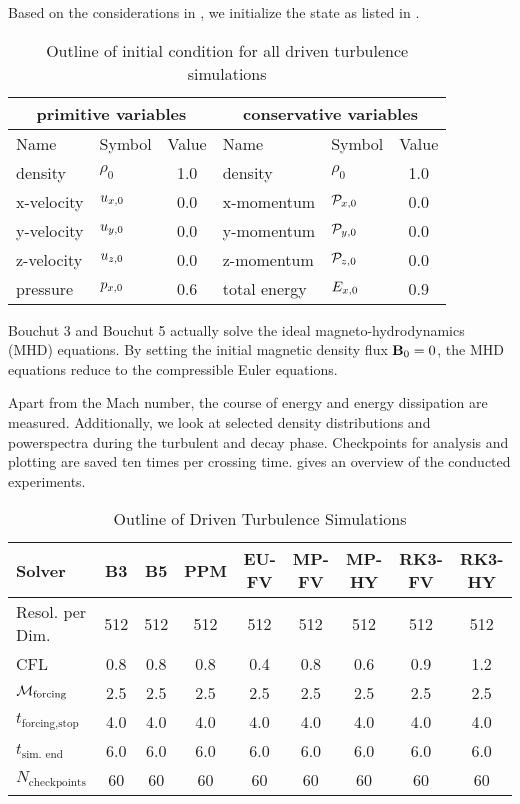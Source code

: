 Based on the considerations in , we initialize the
state as listed in . 
\begin{table}[H]
\caption{Outline of initial condition for all driven turbulence simulations}
\centering
\begin{tabular}{llc|llc}
\toprule
\multicolumn{3}{c}{primitive variables} &
\multicolumn{3}{c}{conservative variables} \\
\midrule
Name & Symbol & Value & Name & Symbol & Value\\
\midrule
density         & $\rho_0$            & 1.0 & density         & $\rho_0$            & 1.0 \\ 
x-velocity      & $u_{x,0}$       & 0.0 & x-momentum      & $\mathcal{P}_{x,0}$           & 0.0 \\ 
y-velocity      & $u_{y,0}$       & 0.0 & y-momentum      & $\mathcal{P}_{y,0}$           & 0.0 \\ 
z-velocity      & $u_{z,0}$       & 0.0 & z-momentum      & $\mathcal{P}_{z,0}$           & 0.0 \\  
pressure        & $p_{x,0}$       & 0.6 & total energy    & $E_{x,0}$       & 0.9 \\  
\bottomrule
\end{tabular}
\label{tab:initial-state}
\end{table}\remark Bouchut 3 and Bouchut 5 actually solve the ideal
magneto-hydrodynamics (MHD) equations. By setting the initial magnetic density
flux $\mathbf{B}_0 = 0$, the MHD equations reduce to the compressible Euler
equations. 

Apart from the Mach number, the course of energy and energy dissipation
are measured. Additionally, we look at selected density distributions and
powerspectra during the turbulent and decay phase. Checkpoints for analysis and
plotting are saved ten times per crossing time.  gives an
overview of the conducted experiments.
\begin{table}[H]
\caption{Outline of Driven Turbulence Simulations}
\centering
\begin{tabular}{l| cccc cccc}
\toprule
Solver                      & B3 & B5 & PPM & EU-FV & MP-FV & MP-HY & RK3-FV & RK3-HY \\
\midrule
Resol. per Dim.             & 512 & 512 & 512 & 512 & 512 & 512 & 512 & 512 \\
CFL                         & 0.8 & 0.8 & 0.8 & 0.4 & 0.8 & 0.6 & 0.9 & 1.2 \\
$\mathcal{M}_{\text{forcing}}$    & 2.5 & 2.5 & 2.5 & 2.5 & 2.5 & 2.5 & 2.5 & 2.5 \\
$t_{\text{forcing,stop}}$   & 4.0 & 4.0 & 4.0 & 4.0 & 4.0 & 4.0 & 4.0 & 4.0 \\
$t_{\text{sim. end}}$       & 6.0 & 6.0 & 6.0 & 6.0 & 6.0 & 6.0 & 6.0 & 6.0 \\
$N_{\text{checkpoints}}$    & 60 & 60 & 60 & 60 & 60 & 60 & 60 & 60 \\
\bottomrule
\end{tabular}
\label{tab:setup-stirturb}
\end{table}

